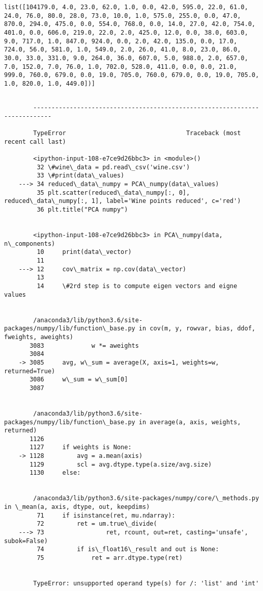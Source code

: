 \documentclass[11pt]{article}
\begin{document}
\begin{Verbatim}[commandchars=\\\{\}]
 list([104179.0, 4.0, 23.0, 62.0, 1.0, 0.0, 42.0, 595.0, 22.0, 61.0, 24.0, 76.0, 80.0, 28.0, 73.0, 10.0, 1.0, 575.0, 255.0, 0.0, 47.0, 870.0, 294.0, 475.0, 0.0, 554.0, 768.0, 0.0, 14.0, 27.0, 42.0, 754.0, 401.0, 0.0, 606.0, 219.0, 22.0, 2.0, 425.0, 12.0, 0.0, 38.0, 603.0, 9.0, 717.0, 1.0, 847.0, 924.0, 0.0, 2.0, 42.0, 135.0, 0.0, 17.0, 724.0, 56.0, 581.0, 1.0, 549.0, 2.0, 26.0, 41.0, 8.0, 23.0, 86.0, 30.0, 33.0, 331.0, 9.0, 264.0, 36.0, 607.0, 5.0, 988.0, 2.0, 657.0, 7.0, 152.0, 7.0, 76.0, 1.0, 702.0, 528.0, 411.0, 0.0, 0.0, 21.0, 999.0, 760.0, 679.0, 0.0, 19.0, 705.0, 760.0, 679.0, 0.0, 19.0, 705.0, 1.0, 820.0, 1.0, 449.0])]

    \end{Verbatim}

    \begin{Verbatim}[commandchars=\\\{\}]

        ---------------------------------------------------------------------------

        TypeError                                 Traceback (most recent call last)

        <ipython-input-108-e7ce9d26bbc3> in <module>()
         32 \#wine\_data = pd.read\_csv('wine.csv')
         33 \#print(data\_values)
    ---> 34 reduced\_data\_numpy = PCA\_numpy(data\_values)
         35 plt.scatter(reduced\_data\_numpy[:, 0], reduced\_data\_numpy[:, 1], label='Wine points reduced', c='red')
         36 plt.title("PCA numpy")


        <ipython-input-108-e7ce9d26bbc3> in PCA\_numpy(data, n\_components)
         10     print(data\_vector)
         11 
    ---> 12     cov\_matrix = np.cov(data\_vector)
         13 
         14     \#2rd step is to compute eigen vectors and eigne values


        /anaconda3/lib/python3.6/site-packages/numpy/lib/function\_base.py in cov(m, y, rowvar, bias, ddof, fweights, aweights)
       3083             w *= aweights
       3084 
    -> 3085     avg, w\_sum = average(X, axis=1, weights=w, returned=True)
       3086     w\_sum = w\_sum[0]
       3087 


        /anaconda3/lib/python3.6/site-packages/numpy/lib/function\_base.py in average(a, axis, weights, returned)
       1126 
       1127     if weights is None:
    -> 1128         avg = a.mean(axis)
       1129         scl = avg.dtype.type(a.size/avg.size)
       1130     else:


        /anaconda3/lib/python3.6/site-packages/numpy/core/\_methods.py in \_mean(a, axis, dtype, out, keepdims)
         71     if isinstance(ret, mu.ndarray):
         72         ret = um.true\_divide(
    ---> 73                 ret, rcount, out=ret, casting='unsafe', subok=False)
         74         if is\_float16\_result and out is None:
         75             ret = arr.dtype.type(ret)


        TypeError: unsupported operand type(s) for /: 'list' and 'int'

    \end{Verbatim}
\end{document}
